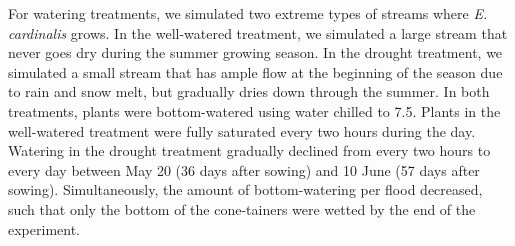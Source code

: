 \documentclass[11pt, oneside]{article}
\begin{document}
For watering treatments, we simulated two extreme types of streams where \textit{E. cardinalis} grows. In the well-watered treatment, we simulated a large stream that never goes dry during the summer growing season. In the drought treatment, we simulated a small stream that has ample flow at the beginning of the season due to rain and snow melt, but gradually dries down through the summer. In both treatments, plants were bottom-watered using  water chilled to 7.5\celsius. Plants in the well-watered treatment were fully saturated every two hours during the day. Watering in the drought treatment gradually declined from every two hours to every day between May 20 (36 days after sowing) and 10 June (57 days after sowing). Simultaneously, the amount of bottom-watering per flood decreased, such that only the bottom of the cone-tainers were wetted by the end of the experiment.
\end{document}

